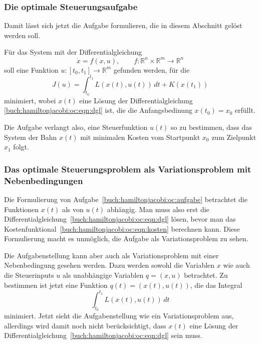 \subsubsection{Die optimale Steuerungsaufgabe}
Damit lässt sich jetzt die Aufgabe formulieren, die in diesem
Abschnitt gelöst werden soll.

\begin{aufgabe}
\label{buch:hamiltonjacobi:oc:aufgabe}
Für das System mit der Differentialgleichung
\begin{equation}
\dot{x}
=
f(x,u), \qquad f\colon \mathbb{R}^n\times\mathbb{R}^m\to\mathbb{R}^n
\label{buch:hamiltonjacobi:oc:eqn:dgl}
\end{equation}
soll eine Funktion $u\colon [t_0,t_1]\to\mathbb{R}^m$ gefunden werden,
für die 
\begin{equation}
J(u)
=
\int_{t_0}^{t_1}
L(x(t),u(t))
\,dt
+
K(x(t_1))
\label{buch:hamiltonjacobi:oc:eqn:kosten}
\end{equation}
minimiert, wobei $x(t)$ eine Lösung der Differentialgleichung
\eqref{buch:hamiltonjacobi:oc:eqn:dgl} ist, die die Anfangsbedinung
$x(t_0)=x_0$ erfüllt.
\end{aufgabe}

Die Aufgabe verlangt also, eine Steuerfunktion $u(t)$ so zu bestimmen,
dass das System der Bahn $x(t)$ mit minimalen Kosten vom Startpunkt $x_0$
zum Zielpunkt $x_1$ folgt.

%
%
\subsubsection{Das optimale Steuerungsproblem als Variationsproblem
mit Nebenbedingungen}
Die Formulierung von Aufgabe~\ref{buch:hamiltonjacobi:oc:aufgabe}
betrachtet die Funktionen $x(t)$ als von $u(t)$ abhängig.
Man muss also erst die
Differentialgleichung~\eqref{buch:hamiltonjacobi:oc:eqn:dgl}
lösen, bevor man das
Kostenfunktional~\eqref{buch:hamiltonjacobi:oc:eqn:kosten}
berechnen kann.
Diese Formulierung macht es unmöglich, die Aufgabe als 
Variationsproblem zu sehen.

Die Aufgabenstellung kann aber auch als Variationsproblem mit
einer Nebenbedingung gesehen werden.
Dazu werden sowohl die Variablen $x$ wie auch die Steuerinputs $u$
als unabhängige Variablen $q=(x,u)$ betrachtet.
Zu bestimmen ist jetzt eine Funktion $q(t)=(x(t),u(t))$, die
das Integral
\[
\int_{t_0}^{t_1}
L(x(t), u(t))
\,dt
\]
minimiert.
Jetzt sieht die Aufgabenstellung wie ein Variationsproblem aus,
allerdings wird damit noch nicht berücksichtigt, dass $x(t)$ eine
Lösung der Differentialgleichung~\eqref{buch:hamiltonjacobi:oc:eqn:dgl}
sein muss.

